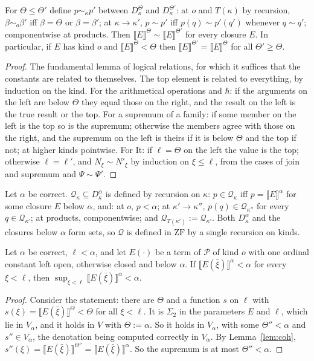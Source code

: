 \documentclass[10pt]{article}
\newcommand{\ZF}{\mathrm{ZF}}
\newcommand{\sem}[1]{\llbracket #1\rrbracket}
\begin{document}
\begin{lemma}[coherence]\label{lem:coh}
For $\Theta\le\Theta'$ define $p\sim_\kappa p'$ between $D^\Theta_\kappa$ and
$D^{\Theta'}_\kappa$: at $o$ and $T(\kappa)$ by recursion, $\beta\sim_o\beta'$ iff
$\beta=\Theta$ or $\beta=\beta'$; at $\kappa\to\kappa'$, $p\sim p'$ iff
$p(q)\sim p'(q')$ whenever $q\sim q'$; componentwise at products. Then
$\sem E^\Theta\sim\sem E^{\Theta'}$ for every closure $E$. In particular,
if $E$ has kind $o$ and $\sem E^\Theta<\Theta$ then
$\sem E^{\Theta'}=\sem E^\Theta$ for all $\Theta'\ge\Theta$.
\end{lemma}
\begin{proof}
The fundamental lemma of logical relations, for which it suffices that
the constants are related to themselves. The top element is related to
everything, by induction on the kind. For the arithmetical operations
and $\hbar$: if the arguments on the left are below $\Theta$ they equal
those on the right, and the result on the left is the true result or the
top. For a supremum of a family: if some member on the left is the top
so is the supremum; otherwise the members agree with those on the right,
and the supremum on the left is theirs if it is below $\Theta$ and the top
if not; at higher kinds pointwise. For $\mathrm{It}$: if
$\ell=\Theta$ on the left the value is the top; otherwise
$\ell=\ell'$, and $N_\xi\sim N'_\xi$ by induction on $\xi\le\ell$, from the
cases of join and supremum and $\Psi\sim\Psi'$.
\end{proof}

\begin{definition}\label{def:Q}
Let $\alpha$ be correct. $\mathcal Q_\kappa\subseteq D^\alpha_\kappa$ is defined by
recursion on $\kappa$: $p\in\mathcal Q_\kappa$ iff $p=\sem E^\alpha$ for some
closure $E$ below $\alpha$, and: at $o$, $p<\alpha$; at $\kappa'\to\kappa''$,
$p(q)\in\mathcal Q_{\kappa''}$ for every $q\in\mathcal Q_{\kappa'}$; at
products, componentwise; and $\mathcal Q_{T(\kappa')}:=\mathcal Q_{\kappa'}$.
Both $D^\alpha_\kappa$ and the closures below $\alpha$ form sets,
so $\mathcal Q$ is defined in $\ZF$ by a single recursion on kinds.
\end{definition}

\begin{lemma}\label{lem:defsup}
Let $\alpha$ be correct, $\ell<\alpha$, and let $E(\cdot)$ be a term of
$\mathcal P$ of kind $o$ with one ordinal constant left open, otherwise
closed and below $\alpha$. If $\sem{E(\bar\xi)}^\alpha<\alpha$ for every
$\xi<\ell$, then $\sup_{\xi<\ell}\sem{E(\bar\xi)}^\alpha<\alpha$.
\end{lemma}
\begin{proof}
Consider the statement: there are $\Theta$ and a function $s$ on $\ell$
with $s(\xi)=\sem{E(\bar\xi)}^\Theta<\Theta$ for all $\xi<\ell$. It is
$\Sigma_2$ in the parameters $E$ and $\ell$, which lie in $V_\alpha$, and
it holds in $V$ with $\Theta:=\alpha$. So it holds in $V_\alpha$, with some
$\Theta''<\alpha$ and $s''\in V_\alpha$, the denotation being computed
correctly in $V_\alpha$. By Lemma~\ref{lem:coh},
$s''(\xi)=\sem{E(\bar\xi)}^{\Theta''}=\sem{E(\bar\xi)}^\alpha$. So the
supremum is at most $\Theta''<\alpha$.
\end{proof}
\end{document}
